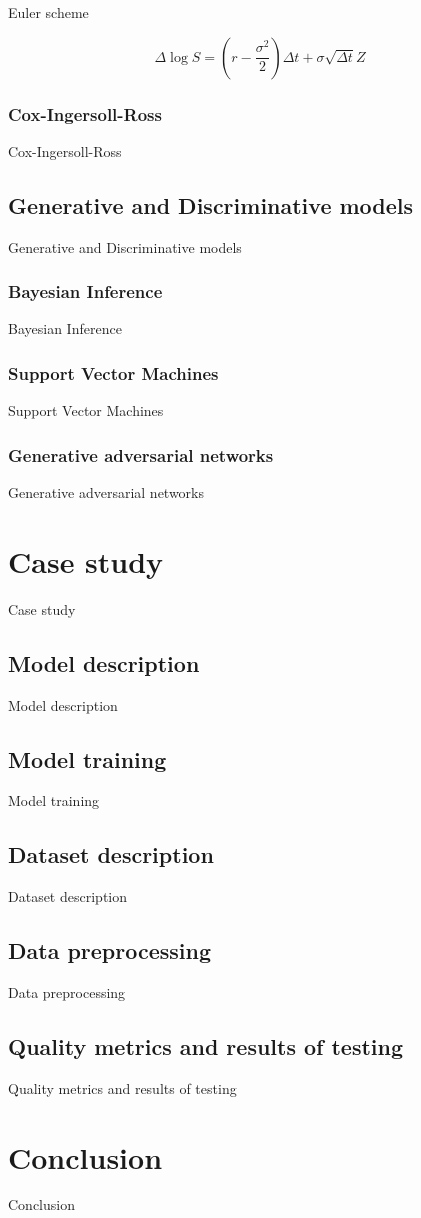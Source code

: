 \documentclass{article}
\theoremstyle{definition}
\begin{document}
Euler scheme

$$\Delta \log S = \left( r - \frac{\sigma^2}{2} \right)\Delta t + \sigma \sqrt{\Delta t}Z$$

\subsubsection{Cox-Ingersoll-Ross}
Cox-Ingersoll-Ross

\subsection{Generative and Discriminative models}
Generative and Discriminative models

\subsubsection{Bayesian Inference}
Bayesian Inference

\subsubsection{Support Vector Machines}
Support Vector Machines

\subsubsection{Generative adversarial networks}
Generative adversarial networks

\section{Case study}
Case study

\subsection{Model description}
Model description

\subsection{Model training}
Model training

\subsection{Dataset description}
Dataset description

\subsection{Data preprocessing}
Data preprocessing

\subsection{Quality metrics and results of testing}
Quality metrics and results of testing

\section{Conclusion}
Conclusion


\end{document}
